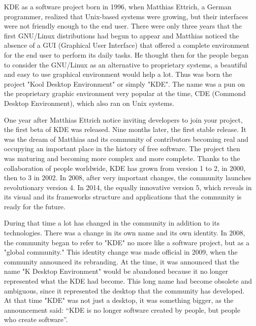 

\noindent{}KDE as a software project born in 1996, when Matthias Ettrich, a German programmer, realized that Unix-based systems were growing, but their interfaces were not friendly enough to the end user. There were only three years that the first GNU/Linux distributions had begun to appear and Matthias noticed the absence of a GUI (Graphical User Interface) that offered a complete environment for the end user to perform its daily tasks. He thought then for the people began to consider the GNU/Linux as an alternative to proprietary systems, a beautiful and easy to use graphical environment would help a lot. Thus was born the project "Kool Desktop Environment" or simply "KDE". The name was a pun on the proprietary graphic environment very popular at the time, CDE (Commond Desktop Environment), which also ran on Unix systems.

One year after Matthias Ettrich notice inviting developers to join your project, the first beta of KDE was released. Nine months later, the first stable release. It was the dream of Matthias and its community of contributors becoming real and occupying an important place in the history of free software. The project then was maturing and becoming more complex and more complete. Thanks to the collaboration of people worldwide, KDE has grown from version 1 to 2, in 2000, then to 3 in 2002. In 2008, after very important changes, the community launches revolutionary version 4. In 2014, the equally innovative version 5, which reveals in its visual and its frameworks structure and applications that the community is ready for the future.

During that time a lot has changed in the community in addition to its technologies. There was a change in its own name and its own identity. In 2008, the community began to refer to "KDE" no more like a software project, but as a "global community." This identity change was made official in 2009, when the community announced its rebranding. At the time, it was announced that the name "K Desktop Environment" would be abandoned because it no longer represented what the KDE had become. This long name had become obsolete and ambiguous, since it represented the desktop that the community has developed. At that time "KDE" was not just a desktop, it was something bigger, as the announcement said: “KDE is no longer software created by people, but people who create software”. 

